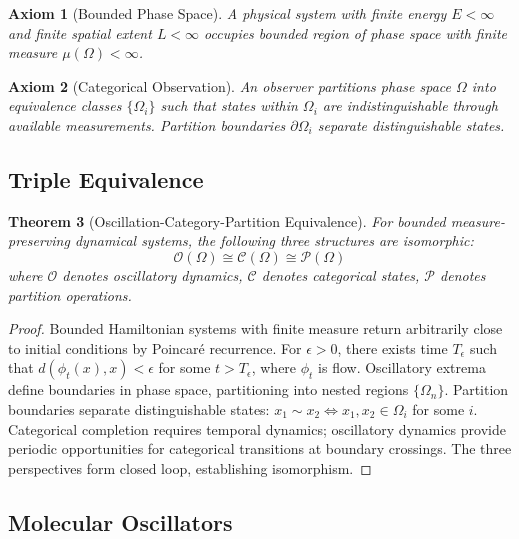 \documentclass[11pt,a4paper]{article}
\newtheorem{theorem}{Theorem}[section]
\newtheorem{axiom}[theorem]{Axiom}
\theoremstyle{remark}
\begin{document}
\begin{axiom}[Bounded Phase Space]
\label{ax:bounded_phase}
A physical system with finite energy $E < \infty$ and finite spatial extent $L < \infty$ occupies bounded region of phase space with finite measure $\mu(\Omega) < \infty$.
\end{axiom}

\begin{axiom}[Categorical Observation]
\label{ax:categorical_obs}
An observer partitions phase space $\Omega$ into equivalence classes $\{\Omega_i\}$ such that states within $\Omega_i$ are indistinguishable through available measurements. Partition boundaries $\partial\Omega_i$ separate distinguishable states.
\end{axiom}

\subsection{Triple Equivalence}

\begin{theorem}[Oscillation-Category-Partition Equivalence]
\label{thm:triple_equiv}
For bounded measure-preserving dynamical systems, the following three structures are isomorphic:
\begin{equation}
\mathcal{O}(\Omega) \cong \mathcal{C}(\Omega) \cong \mathcal{P}(\Omega)
\end{equation}
where $\mathcal{O}$ denotes oscillatory dynamics, $\mathcal{C}$ denotes categorical states, $\mathcal{P}$ denotes partition operations.
\end{theorem}

\begin{proof}
Bounded Hamiltonian systems with finite measure return arbitrarily close to initial conditions by Poincaré recurrence. For $\epsilon > 0$, there exists time $T_\epsilon$ such that $d(\phi_t(x), x) < \epsilon$ for some $t > T_\epsilon$, where $\phi_t$ is flow. Oscillatory extrema define boundaries in phase space, partitioning into nested regions $\{\Omega_n\}$. Partition boundaries separate distinguishable states: $x_1 \sim x_2 \iff x_1, x_2 \in \Omega_i$ for some $i$. Categorical completion requires temporal dynamics; oscillatory dynamics provide periodic opportunities for categorical transitions at boundary crossings. The three perspectives form closed loop, establishing isomorphism.
\end{proof}

\subsection{Molecular Oscillators}
\end{document}
